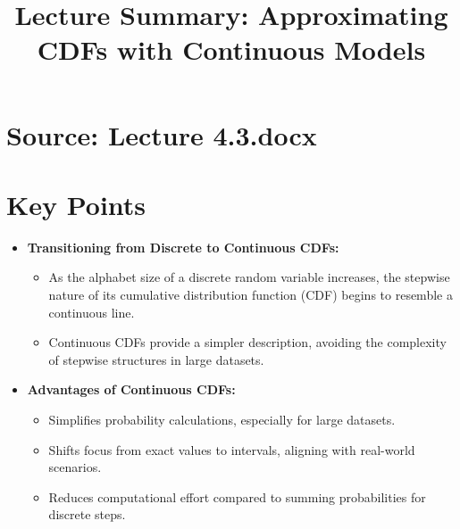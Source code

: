 \documentclass{article}
\title{Lecture Summary: Approximating CDFs with Continuous Models}
\author{}
\date{}
\begin{document}
\maketitle

\section*{Source: Lecture 4.3.docx}

\section*{Key Points}

\begin{itemize}
  \item \textbf{Transitioning from Discrete to Continuous CDFs:}
    \begin{itemize}
      \item As the alphabet size of a discrete random variable increases, the stepwise nature of its cumulative distribution function (CDF) begins to resemble a continuous line.
      \item Continuous CDFs provide a simpler description, avoiding the complexity of stepwise structures in large datasets.
    \end{itemize}

  \item \textbf{Advantages of Continuous CDFs:}
    \begin{itemize}
      \item Simplifies probability calculations, especially for large datasets.
      \item Shifts focus from exact values to intervals, aligning with real-world scenarios.
      \item Reduces computational effort compared to summing probabilities for discrete steps.
    \end{itemize}


\end{itemize}
\end{document}
